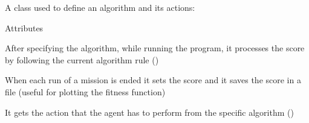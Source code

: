\documentclass[letterpaper,10pt,english]{sphinxmanual}
\begin{document}
\begin{fulllineitems}
\label{\detokenize{index:algorithms.algorithm.algorithm}}
A class used to define an algorithm and its actions:
\begin{description}
\item[{Attributes}] \leavevmode
\end{description}

\begin{fulllineitems}
\label{\detokenize{index:algorithms.algorithm.algorithm.process_score}}
After specifying the algorithm, while running the program, it processes
the score by following the current algorithm rule ()

\end{fulllineitems}


\begin{fulllineitems}
\label{\detokenize{index:algorithms.algorithm.algorithm.set_score}}
When each run of a mission is ended it sets the score and it saves the score in a
 file (useful for plotting the fitness function)

\end{fulllineitems}


\begin{fulllineitems}
\label{\detokenize{index:algorithms.algorithm.algorithm.get_action}}
It gets the action that the agent has to perform from the specific algorithm ()

\end{fulllineitems}


\end{fulllineitems}
\end{document}
